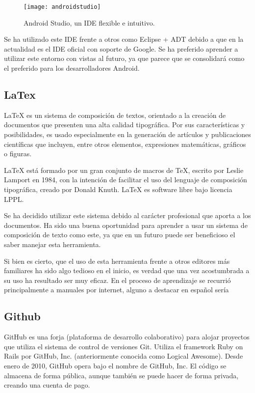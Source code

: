 \begin{figure}[h]
	\centering
	\texttt{[image: androidstudio]}
	\caption{Android Studio, un IDE flexible e intuitivo.}
	\label{fig:androidstudio}
\end{figure}

Se ha utilizado este IDE frente a otros como Eclipse + ADT \cite{URL::eclipseADT} debido a que en la actualidad es el IDE oficial con soporte de Google. Se ha preferido aprender a utilizar este entorno con vistas al futuro, ya que parece que se consolidará como el preferido para los desarrolladores Android.

\subsection{LaTex}

LaTeX \cite{URL::LaTeX} es un sistema de composición de textos, orientado a la creación de documentos que presenten una alta calidad tipográfica. Por sus características y posibilidades, es usado especialmente en la generación de artículos y publicaciones científicas que incluyen, entre otros elementos, expresiones matemáticas, gráficos o figuras.


LaTeX está formado por un gran conjunto de macros de TeX, escrito por Leslie Lamport en 1984, con la intención de facilitar el uso del lenguaje de composición tipográfica, creado por Donald Knuth. LaTeX es software libre bajo licencia LPPL.


Se ha decidido utilizar este sistema debido al carácter profesional que aporta a los documentos. Ha sido una buena oportunidad para aprender a usar un sistema de composición de texto como este, ya que en un futuro puede ser beneficioso el saber manejar esta herramienta. 


Si bien es cierto, que el uso de esta herramienta frente a otros editores más familiares ha sido algo tedioso en el inicio, es verdad que una vez acostumbrada a su uso ha resultado ser muy eficaz. En el proceso de aprendizaje se recurrió principalmente a manuales por internet, alguno a destacar en español sería \cite{URL::manualLatex}

\subsection{Github}

GitHub\cite{URL::Github} es una forja (plataforma de desarrollo colaborativo) para alojar proyectos que utiliza el sistema de control de versiones Git. Utiliza el framework Ruby on Rails por GitHub, Inc. (anteriormente conocida como Logical Awesome). Desde enero de 2010, GitHub opera bajo el nombre de GitHub, Inc. El código se almacena de forma pública, aunque también se puede hacer de forma privada, creando una cuenta de pago.


